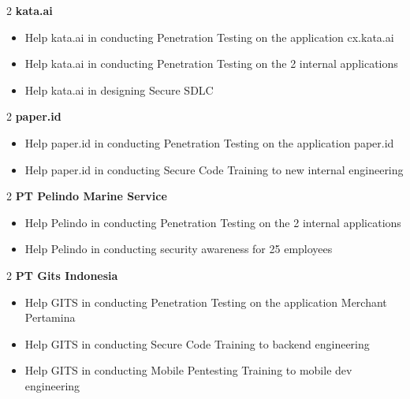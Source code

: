 \documentclass[10pt, letterpaper]{article}
\newenvironment{highlights}{
    \begin{itemize}[
        topsep=0.10 cm,
        parsep=0.10 cm,
        partopsep=0pt,
        itemsep=0pt,
        leftmargin=0 cm + 10pt
    ]
}{
    \end{itemize}
} %
\newenvironment{twocolentry}[2][]{
    \onecolentry
    \def\secondColumn{#2}
    \setcolumnwidth{\fill, 4.5 cm}
    \begin{paracol}{2}
}{
    \switchcolumn \raggedleft \secondColumn
    \end{paracol}
    \endonecolentry
} %
\begin{document}
		 \vspace{0.20 cm}
		\begin{samepage}
			\begin{twocolentry}{}{\textbf{kata.ai}}
			\end{twocolentry}
			
			\begin{highlights}
				\item Help kata.ai in conducting Penetration Testing on the application cx.kata.ai
				\item Help kata.ai in conducting Penetration Testing on the 2 internal applications
				\item Help kata.ai in designing Secure SDLC
			\end{highlights}
		\end{samepage}
		
		
		 \vspace{0.20 cm}

		\begin{samepage}
			\begin{twocolentry}{}{\textbf{paper.id}}
			\end{twocolentry}
			
			\begin{highlights}
				\item Help paper.id in conducting Penetration Testing on the application paper.id
				\item Help paper.id in conducting Secure Code Training to new internal engineering
			\end{highlights}
		\end{samepage}
		 \vspace{0.20 cm}
		\begin{samepage}
			\begin{twocolentry}{}{\textbf{PT Pelindo Marine Service}}
			\end{twocolentry}
			
			\begin{highlights}
				\item Help Pelindo in conducting Penetration Testing on the 2 internal applications
				\item Help Pelindo in conducting security awareness for 25 employees
			\end{highlights}
		\end{samepage}
		
		\vspace{0.20 cm}
		\begin{samepage}
			\begin{twocolentry}{}{\textbf{PT Gits Indonesia}}
			\end{twocolentry}
			
			\begin{highlights}
				\item Help GITS in conducting Penetration Testing on the application Merchant Pertamina
				\item Help GITS in conducting Secure Code Training to backend engineering
				\item Help GITS in conducting Mobile Pentesting Training to mobile dev engineering
			\end{highlights}
		\end{samepage}
\end{document}
